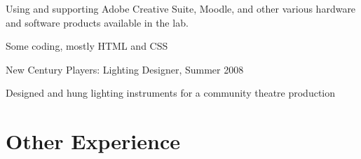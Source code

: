 \documentclass[letterpaper]{article}
\renewenvironment{itemize}{\begin{list}{}{\setlength{\leftmargin}{1.5em}}}{\end{list}}%
\begin{document}
\begin{itemize}
\begin{itemize}
	\item Using and supporting Adobe Creative Suite, Moodle, and other various hardware and software products available in the lab.
	\item Some coding, mostly HTML and CSS
	\end{itemize}
\item New Century Players: Lighting Designer, Summer 2008
	\begin{itemize}
	\item Designed and hung lighting instruments for a community theatre production
	\end{itemize}
\end{itemize}

\section*{Other Experience}%
\end{document}
